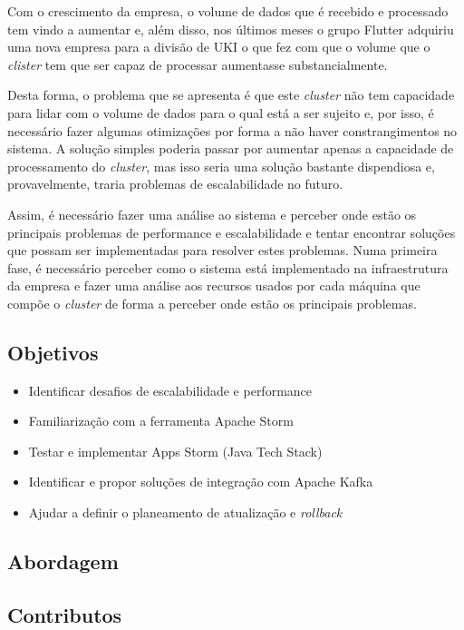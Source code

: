 Com o crescimento da empresa, o volume de dados que é recebido e processado tem vindo a aumentar
e, além disso, nos últimos meses o grupo Flutter adquiriu uma nova empresa para a divisão de \ac{UKI}
o que fez com que o volume que o \textit{clister} tem que ser capaz de processar aumentasse
substancialmente.

Desta forma, o problema que se apresenta é que este \textit{cluster} não tem capacidade para lidar
com o volume de dados para o qual está a ser sujeito e, por isso, é necessário fazer algumas
otimizações por forma a não haver constrangimentos no sistema. A solução simples poderia passar
por aumentar apenas a capacidade de processamento do \textit{cluster}, mas isso seria uma solução
bastante dispendiosa e, provavelmente, traria problemas de escalabilidade no futuro.

Assim, é necessário fazer uma análise ao sistema e perceber onde estão os principais problemas
de performance e escalabilidade e tentar encontrar soluções que possam ser implementadas para
resolver estes problemas. Numa primeira fase, é necessário perceber como o sistema está implementado
na infraestrutura da empresa e fazer uma análise aos recursos usados por cada máquina que compõe
o \textit{cluster} de forma a perceber onde estão os principais problemas.

\subsection{Objetivos}
\label{sec:1-obj}

\begin{itemize}
  \item Identificar desafios de escalabilidade e performance
  \item Familiarização com a ferramenta Apache Storm 
  \item Testar e implementar Apps Storm (Java Tech Stack) 
  \item Identificar e propor soluções de integração com Apache Kafka 
  \item Ajudar a definir o planeamento de atualização e \textit{rollback}
\end{itemize}

\subsection{Abordagem}


\subsection{Contributos}



